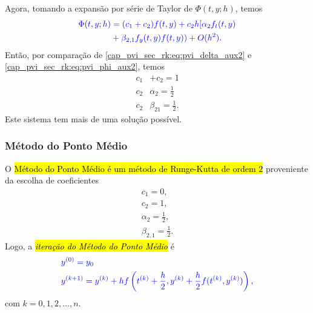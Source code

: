 Agora, tomando a expansão por série de Taylor de $\Phi(t, y; h)$, temos
\begin{equation}\label{cap_pvi_sec_rk:eq:pvi_phi_aux2}\color{blue}\begin{aligned}
    \Phi(t, y; h) &= (c_1+c_2)f(t,y) + c_2h[\alpha_2f_t(t,y)\\
    &+\beta_{2,1}f_y(t,y)f(t,y)) + O(h^2).
  \end{aligned}
\end{equation}
Então, por comparação de \eqref{cap_pvi_sec_rk:eq:pvi_delta_aux2} e \eqref{cap_pvi_sec_rk:eq:pvi_phi_aux2}, temos
\begin{align}
  c_1&+c_2 = 1\\
  c_2&\alpha_2 = \frac{1}{2}\\
  c_2&\beta_{21} = \frac{1}{2}.
\end{align}
Este sistema tem mais de uma solução possível.

\subsubsection{Método do Ponto Médio}

O \hl{Método do Ponto Médio é um método de Runge-Kutta de ordem $2$} proveniente da escolha de coeficientes
\begin{equation}
  \begin{aligned}
    c_1 = 0, \\
    c_2 = 1, \\
    \alpha_2 = \frac{1}{2},\\
    \beta_{2,1}=\frac{1}{2}.
\end{aligned}
\end{equation}
Logo, a \hl{\emph{iteração do Método do Ponto Médio}} é
\begin{equation}\label{cap_pvi_sec_rk:eq:iter_pm}\color{blue}\begin{aligned}
    &y^{(0)} = y_0\\
    &y^{(k+1)} = y^{(k)} + hf\left(t^{(k)}+\frac{h}{2}, y^{(k)}+\frac{h}{2}f(t^{(k)},y^{(k)})\right),
  \end{aligned}
\end{equation}
com $k = 0, 1, 2, \dotsc, n$.

